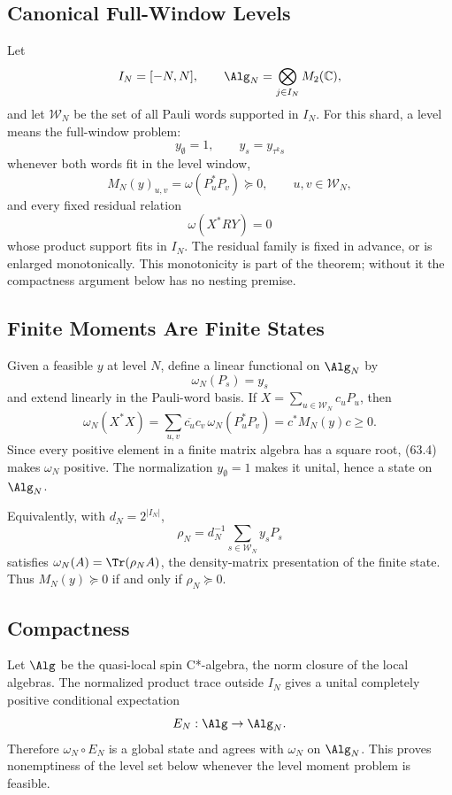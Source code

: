 \subsection{Canonical Full-Window Levels}

Let
\[
  I_N=[-N,N],\qquad
  \Alg_N=\bigotimes_{j\in I_N}M_2(\mathbb C),
\]
and let \(\mathcal W_N\) be the set of all Pauli words supported in \(I_N\).
For this shard, a level means the full-window problem:
\[
  y_\emptyset=1,\qquad y_s=y_{\tau^k s}
  \tag{63.1}
\]
whenever both words fit in the level window,
\[
  M_N(y)_{u,v}=\omega(P_u^*P_v)\succeq0,
  \qquad u,v\in\mathcal W_N,
  \tag{63.2}
\]
and every fixed residual relation
\[
  \omega(X^*RY)=0
  \tag{63.3}
\]
whose product support fits in \(I_N\).  The residual family is fixed in
advance, or is enlarged monotonically.  This monotonicity is part of the
theorem; without it the compactness argument below has no nesting premise.

\subsection{Finite Moments Are Finite States}

Given a feasible \(y\) at level \(N\), define a linear functional on
\(\Alg_N\) by
\[
  \omega_N(P_s)=y_s
\]
and extend linearly in the Pauli-word basis.  If
\(X=\sum_{u\in\mathcal W_N}c_uP_u\), then
\[
  \omega_N(X^*X)
  =
  \sum_{u,v}\overline{c_u}c_v\,\omega_N(P_u^*P_v)
  =
  c^*M_N(y)c
  \ge0.
  \tag{63.4}
\]
Since every positive element in a finite matrix algebra has a square root,
(63.4) makes \(\omega_N\) positive.  The normalization \(y_\emptyset=1\)
makes it unital, hence a state on \(\Alg_N\).

Equivalently, with \(d_N=2^{|I_N|}\),
\[
  \rho_N=d_N^{-1}\sum_{s\in\mathcal W_N}y_sP_s
  \tag{63.5}
\]
satisfies \(\omega_N(A)=\Tr(\rho_NA)\), the density-matrix presentation of the
finite state.  Thus \(M_N(y)\succeq0\) if and only if \(\rho_N\succeq0\).

\subsection{Compactness}

Let \(\Alg\) be the quasi-local spin C*-algebra, the norm closure of the
local algebras.  The normalized product trace outside \(I_N\) gives a unital
completely positive conditional expectation
\[
  E_N:\Alg\to\Alg_N.
\]
Therefore \(\omega_N\circ E_N\) is a global state and agrees with
\(\omega_N\) on \(\Alg_N\).  This proves nonemptiness of the level set
below whenever the level moment problem is feasible.

